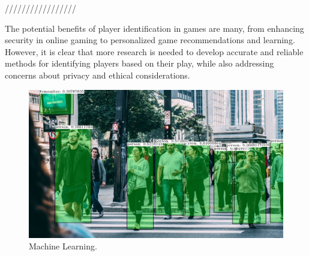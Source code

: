 \begin{spacing}{2.0}
/////////////////

The potential benefits of player identification in games are many, from enhancing security in online gaming to personalized game recommendations and learning. However, it is clear that more research is needed to develop accurate and reliable methods for identifying players based on their play, while also addressing concerns about privacy and ethical considerations.

\begin{figure}[ht]
\centering
\includegraphics[width=5in, fbox]{Figures/opencv.png}
\caption{Machine Learning.}
\label{fig:opencvexample} 
\end{figure}

\end{spacing}
\newpage
